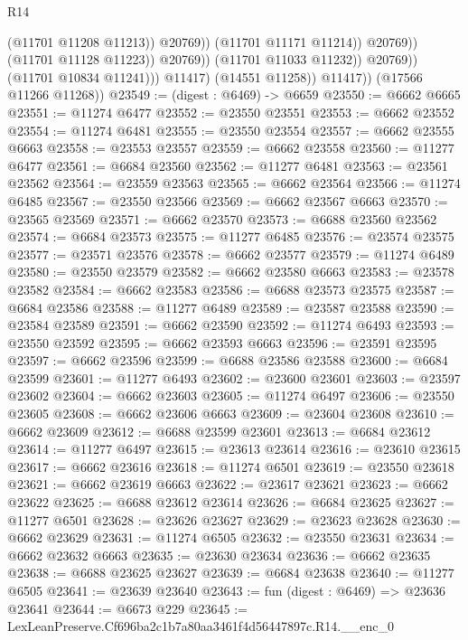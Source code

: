 \begin{lexlean}{R14}
\begin{coremodule}
                                          (@11701 @11208 @11213))
                                        @20769))
                                    (@11701 @11171 @11214))
                                  @20769))
                              (@11701 @11128 @11223))
                            @20769))
                        (@11701 @11033 @11232))
                      @20769))
                  (@11701 @10834 @11241)))
              @11417)
            (@14551 @11258))
          @11417))
      (@17566 @11266 @11268))
@23549 := (digest : @6469) -> @6659
@23550 := @6662 @6665
@23551 := @11274 @6477
@23552 := @23550 @23551
@23553 := @6662 @23552
@23554 := @11274 @6481
@23555 := @23550 @23554
@23557 := @6662 @23555 @6663
@23558 := @23553 @23557
@23559 := @6662 @23558
@23560 := @11277 @6477
@23561 := @6684 @23560
@23562 := @11277 @6481
@23563 := @23561 @23562
@23564 := @23559 @23563
@23565 := @6662 @23564
@23566 := @11274 @6485
@23567 := @23550 @23566
@23569 := @6662 @23567 @6663
@23570 := @23565 @23569
@23571 := @6662 @23570
@23573 := @6688 @23560 @23562
@23574 := @6684 @23573
@23575 := @11277 @6485
@23576 := @23574 @23575
@23577 := @23571 @23576
@23578 := @6662 @23577
@23579 := @11274 @6489
@23580 := @23550 @23579
@23582 := @6662 @23580 @6663
@23583 := @23578 @23582
@23584 := @6662 @23583
@23586 := @6688 @23573 @23575
@23587 := @6684 @23586
@23588 := @11277 @6489
@23589 := @23587 @23588
@23590 := @23584 @23589
@23591 := @6662 @23590
@23592 := @11274 @6493
@23593 := @23550 @23592
@23595 := @6662 @23593 @6663
@23596 := @23591 @23595
@23597 := @6662 @23596
@23599 := @6688 @23586 @23588
@23600 := @6684 @23599
@23601 := @11277 @6493
@23602 := @23600 @23601
@23603 := @23597 @23602
@23604 := @6662 @23603
@23605 := @11274 @6497
@23606 := @23550 @23605
@23608 := @6662 @23606 @6663
@23609 := @23604 @23608
@23610 := @6662 @23609
@23612 := @6688 @23599 @23601
@23613 := @6684 @23612
@23614 := @11277 @6497
@23615 := @23613 @23614
@23616 := @23610 @23615
@23617 := @6662 @23616
@23618 := @11274 @6501
@23619 := @23550 @23618
@23621 := @6662 @23619 @6663
@23622 := @23617 @23621
@23623 := @6662 @23622
@23625 := @6688 @23612 @23614
@23626 := @6684 @23625
@23627 := @11277 @6501
@23628 := @23626 @23627
@23629 := @23623 @23628
@23630 := @6662 @23629
@23631 := @11274 @6505
@23632 := @23550 @23631
@23634 := @6662 @23632 @6663
@23635 := @23630 @23634
@23636 := @6662 @23635
@23638 := @6688 @23625 @23627
@23639 := @6684 @23638
@23640 := @11277 @6505
@23641 := @23639 @23640
@23643 := fun (digest : @6469) => @23636 @23641
@23644 := @6673 @229
@23645 := LexLeanPreserve.Cf696ba2c1b7a80aa3461f4d56447897c.R14.__enc_0

\end{coremodule}
\end{lexlean}
